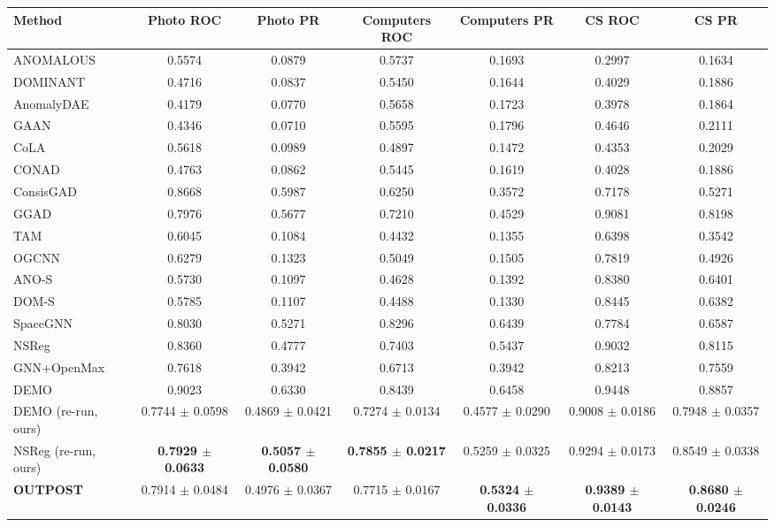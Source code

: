 \begin{table}[t]
\centering
\small
\begin{tabular}{lcccccc}
\toprule
Method & Photo ROC & Photo PR & Computers ROC & Computers PR & CS ROC & CS PR \\
\midrule
ANOMALOUS & 0.5574 & 0.0879 & 0.5737 & 0.1693 & 0.2997 & 0.1634 \\
DOMINANT & 0.4716 & 0.0837 & 0.5450 & 0.1644 & 0.4029 & 0.1886 \\
AnomalyDAE & 0.4179 & 0.0770 & 0.5658 & 0.1723 & 0.3978 & 0.1864 \\
GAAN & 0.4346 & 0.0710 & 0.5595 & 0.1796 & 0.4646 & 0.2111 \\
CoLA & 0.5618 & 0.0989 & 0.4897 & 0.1472 & 0.4353 & 0.2029 \\
CONAD & 0.4763 & 0.0862 & 0.5445 & 0.1619 & 0.4028 & 0.1886 \\
ConsisGAD & 0.8668 & 0.5987 & 0.6250 & 0.3572 & 0.7178 & 0.5271 \\
GGAD & 0.7976 & 0.5677 & 0.7210 & 0.4529 & 0.9081 & 0.8198 \\
TAM & 0.6045 & 0.1084 & 0.4432 & 0.1355 & 0.6398 & 0.3542 \\
OGCNN & 0.6279 & 0.1323 & 0.5049 & 0.1505 & 0.7819 & 0.4926 \\
ANO-S & 0.5730 & 0.1097 & 0.4628 & 0.1392 & 0.8380 & 0.6401 \\
DOM-S & 0.5785 & 0.1107 & 0.4488 & 0.1330 & 0.8445 & 0.6382 \\
SpaceGNN & 0.8030 & 0.5271 & 0.8296 & 0.6439 & 0.7784 & 0.6587 \\
NSReg & 0.8360 & 0.4777 & 0.7403 & 0.5437 & 0.9032 & 0.8115 \\
GNN+OpenMax & 0.7618 & 0.3942 & 0.6713 & 0.3942 & 0.8213 & 0.7559 \\
DEMO & 0.9023 & 0.6330 & 0.8439 & 0.6458 & 0.9448 & 0.8857 \\
DEMO (re-run, ours) & 0.7744 $\pm$ 0.0598 & 0.4869 $\pm$ 0.0421 & 0.7274 $\pm$ 0.0134 & 0.4577 $\pm$ 0.0290 & 0.9008 $\pm$ 0.0186 & 0.7948 $\pm$ 0.0357 \\
NSReg (re-run, ours) & \textbf{0.7929 $\pm$ 0.0633} & \textbf{0.5057 $\pm$ 0.0580} & \textbf{0.7855 $\pm$ 0.0217} & 0.5259 $\pm$ 0.0325 & 0.9294 $\pm$ 0.0173 & 0.8549 $\pm$ 0.0338 \\
\midrule
\textbf{OUTPOST} & 0.7914 $\pm$ 0.0484 & 0.4976 $\pm$ 0.0367 & 0.7715 $\pm$ 0.0167 & \textbf{0.5324 $\pm$ 0.0336} & \textbf{0.9389 $\pm$ 0.0143} & \textbf{0.8680 $\pm$ 0.0246} \\
\bottomrule

\end{tabular}
\end{table}
